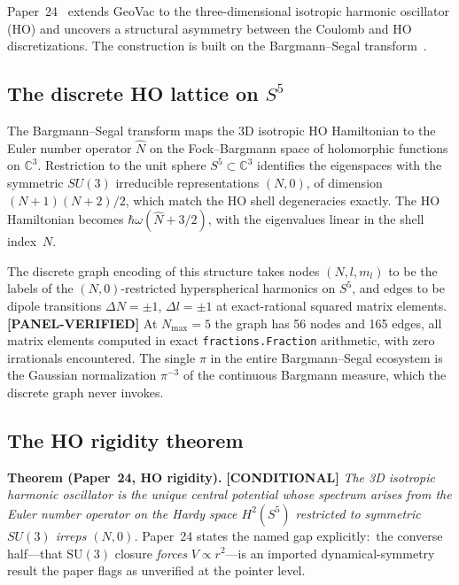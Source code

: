\documentclass[aps,pra,twocolumn,superscriptaddress,longbibliography]{revtex4-2}
\begin{document}
Paper~24~\cite{loutey_paper24} extends GeoVac to the three-dimensional
isotropic harmonic oscillator (HO) and uncovers a structural asymmetry
between the Coulomb and HO discretizations.  The construction is built
on the Bargmann--Segal transform~\cite{bargmann1961, hall1994}.

\subsection*{The discrete HO lattice on $S^5$}

The Bargmann--Segal transform maps the 3D isotropic HO Hamiltonian to
the Euler number operator $\hat{N}$ on the Fock--Bargmann space of
holomorphic functions on $\mathbb{C}^3$.  Restriction to the unit
sphere $S^5 \subset \mathbb{C}^3$ identifies the eigenspaces with the
symmetric $SU(3)$ irreducible representations $(N, 0)$, of dimension
$(N + 1)(N + 2)/2$, which match the HO shell degeneracies exactly.
The HO Hamiltonian becomes $\hbar \omega (\hat{N} + 3/2)$, with the
eigenvalues linear in the shell index~$N$.

The discrete graph encoding of this structure takes nodes
$(N, l, m_l)$ to be the labels of the $(N, 0)$-restricted
hyperspherical harmonics on $S^5$, and edges to be dipole transitions
$\Delta N = \pm 1$, $\Delta l = \pm 1$ at exact-rational squared
matrix elements.  \textbf{[PANEL-VERIFIED]} At $N_{\max} = 5$ the graph has 56 nodes and 165
edges, all matrix elements computed in exact
\texttt{fractions.Fraction} arithmetic, with zero irrationals
encountered.  The single $\pi$ in the entire Bargmann--Segal
ecosystem is the Gaussian normalization $\pi^{-3}$ of the continuous
Bargmann measure, which the discrete graph never invokes.

\subsection*{The HO rigidity theorem}

\medskip
\noindent\textbf{Theorem (Paper~24, HO rigidity).}  \textbf{[CONDITIONAL]} \emph{The 3D
isotropic harmonic oscillator is the unique central potential whose
spectrum arises from the Euler number operator on the Hardy space
$H^2(S^5)$ restricted to symmetric $SU(3)$ irreps $(N, 0)$.}  Paper~24
states the named gap explicitly:\ the converse half---that
$\mathrm{SU}(3)$ closure \emph{forces} $V \propto r^2$---is an imported
dynamical-symmetry result the paper flags as unverified at the
pointer level.

\medskip
\end{document}
